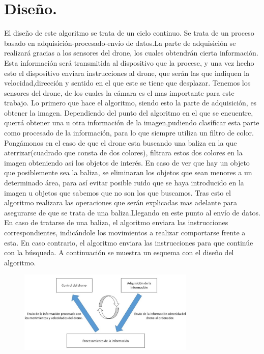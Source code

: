 \section{Diseño.}
\hspace{1cm} El diseño de este algoritmo se trata de un ciclo continuo. Se trata de un proceso basado en adquisici\'on-procesado-env\'io de datos.La parte de adquisici\'on se realizar\'a gracias a los sensores del drone, los cuales obtendr\'an cierta informaci\'on. Esta informaci\'on ser\'a transmitida al dispositivo que la procese, y una vez hecho esto el dispositivo enviara instrucciones al drone, que ser\'an las que indiquen la velocidad,direcci\'on y sentido en el que este se tiene que desplazar.  Tenemos los sensores del drone, de los cuales la c\'amara es el mas importante para este trabajo. Lo primero que hace el algoritmo, siendo esto la parte de adquisici\'on, es obtener la imagen. Dependiendo del punto del algoritmo en el que se encuentre, querr\'a obtener una u otra informaci\'on de la imagen,pudiendo clas\'ificar esta parte como procesado de la informaci\'on, para lo que siempre utiliza un filtro de color. Pong\'amonos en el caso de que el drone esta buscando una baliza en la que aterrizar(cuadrado que consta de dos colores), filtrara estos dos colores en la imagen obteniendo as\'i los objetos de inter\'es. En caso de ver que hay un objeto que posiblemente sea la baliza, se eliminaran los objetos que sean menores a un determinado \'area, para as\'i evitar posible ruido que se haya introducido en la imagen u objetos que sabemos que no son los que buscamos. Tras esto el algoritmo realizara las operaciones que ser\'an explicadas mas adelante para asegurarse de que se trata de una baliza.Llegando en este punto al env\'io de datos. En caso de tratarse de una baliza, el algoritmo enviara las instrucciones correspondientes, indic\'andole los movimientos a realizar comportarse frente a esta. En caso contrario, el algoritmo enviara las instrucciones para que contin\'ue con la b\'usqueda. A continuación se muestra un esquema con el diseño del algoritmo. 

\begin{figure}[H]
	\centering
		\includegraphics[width=0.75\textwidth]{imgs/esquema_d.jpg}
	\label{fig:esquema_d}
\end{figure}


